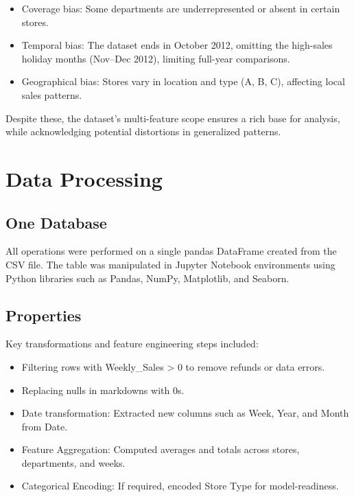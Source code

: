 \begin{itemize}
	\item Coverage bias: Some departments are underrepresented or absent in certain stores.
	\item Temporal bias: The dataset ends in October 2012, omitting the high-sales holiday months (Nov–Dec 2012), limiting full-year comparisons.
	\item Geographical bias: Stores vary in location and type (A, B, C), affecting local sales patterns.
\end{itemize}

Despite these, the dataset’s multi-feature scope ensures a rich base for analysis, while acknowledging potential distortions in generalized patterns.




\section{Data Processing}

\subsection{One Database}

All operations were performed on a single pandas DataFrame created from the CSV file. The table was manipulated in Jupyter Notebook environments using Python libraries such as Pandas, NumPy, Matplotlib, and Seaborn.

\subsection{Properties}

Key transformations and feature engineering steps included:

\begin{itemize}
	\item Filtering rows with Weekly\_Sales > 0 to remove refunds or data errors.
	\item Replacing nulls in markdowns with 0s.
	\item Date transformation: Extracted new columns such as Week, Year, and Month from Date.
	\item Feature Aggregation: Computed averages and totals across stores, departments, and weeks.
	\item Categorical Encoding: If required, encoded Store Type for model-readiness.
\end{itemize}

